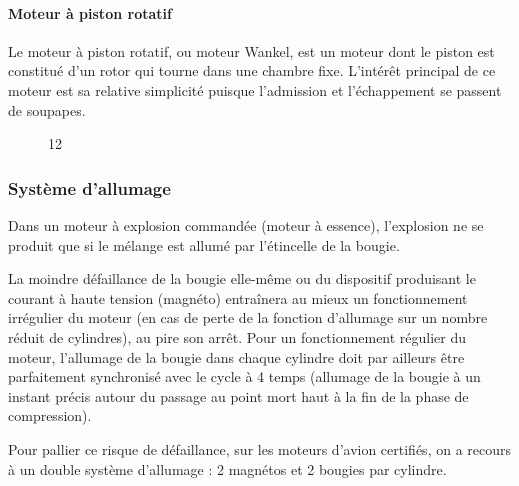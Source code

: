 	\paragraph{Moteur à piston rotatif}
	Le moteur à piston rotatif, ou moteur Wankel, est un moteur dont le piston est constitué d'un rotor qui tourne dans une chambre fixe. L'intérêt principal de ce moteur est sa relative simplicité puisque l'admission et l'échappement se passent de soupapes.
	
	
	
	\begin{figure}[H]
		\ifdefined\activeranimations 
		\newcommand{\nbFramesMoteurWankel}{72}
		\else
		\newcommand{\nbFramesMoteurWankel}{1}
		\fi
		
		\centering
		\begin{animateinline}{12}
		    \multiframe{\nbFramesMoteurWankel}{ixb=0+15}{
		    \Wankel{\ixb}}
		\end{animateinline}
	\end{figure}
	
	\subsubsection{Système d'allumage}
	Dans un moteur à explosion commandée (moteur à essence), l'explosion ne se produit que si le mélange est allumé par l'étincelle de la bougie.
	
	La moindre défaillance de la bougie elle-même ou du dispositif produisant le courant à haute tension (magnéto) entraînera au mieux un fonctionnement irrégulier du moteur (en cas de perte de la fonction d'allumage sur un nombre réduit de cylindres), au pire son arrêt. Pour un fonctionnement régulier du moteur, l'allumage de la bougie dans chaque cylindre doit par ailleurs être parfaitement synchronisé avec le cycle à 4 temps (allumage de la bougie à un instant précis autour du passage au point mort haut à la fin de la phase de compression).
	
	Pour pallier ce risque de défaillance, sur les moteurs d'avion certifiés, on a recours à un double système d'allumage : 2 magnétos et 2 bougies par cylindre.
	

